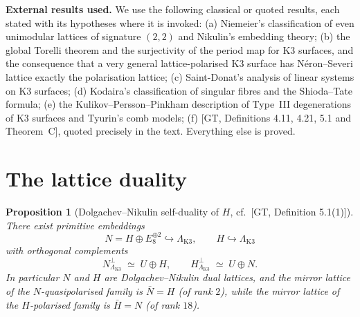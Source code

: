 \documentclass[11pt]{article}
\newtheorem{proposition}[theorem]{Proposition}
\begin{document}
\medskip

\noindent\textbf{External results used.} We use the following classical or
quoted results, each stated with its hypotheses where it is invoked:
(a) Niemeier's classification of even unimodular lattices of signature
$(2,2)$ and Nikulin's embedding theory; (b) the global Torelli theorem and
the surjectivity of the period map for K3 surfaces, and the consequence
that a very general lattice-polarised K3 surface has N\'eron--Severi lattice
exactly the polarisation lattice; (c) Saint-Donat's analysis of linear
systems on K3 surfaces; (d) Kodaira's classification of singular fibres and
the Shioda--Tate formula; (e) the Kulikov--Persson--Pinkham description of
Type~III degenerations of K3 surfaces and Tyurin's comb models; (f)
[GT, Definitions 4.11, 4.21, 5.1 and Theorem~C], quoted precisely in the
text. Everything else is proved.

\section{The lattice duality}\label{sec:lattice-duality}

\begin{proposition}[Dolgachev--Nikulin self-duality of $H$,
{cf.\ [GT, Definition 5.1(1)]}]\label{prop:DN}
There exist primitive embeddings
\[
N=H\oplus E_8^{\oplus 2}\hookrightarrow\Lambda_{\mathrm{K3}},
\qquad
H\hookrightarrow\Lambda_{\mathrm{K3}}
\]
with orthogonal complements
\[
N^{\perp}_{\Lambda_{\mathrm{K3}}}\;\simeq\;U\oplus H,
\qquad
H^{\perp}_{\Lambda_{\mathrm{K3}}}\;\simeq\;U\oplus N.
\]
In particular $N$ and $H$ are Dolgachev--Nikulin dual lattices, and the
mirror lattice of the $N$-quasipolarised family is $\bar N=H$ (of rank
$2$), while the mirror lattice of the $H$-polarised family is
$\bar H = N$ (of rank $18$).
\end{proposition}
\end{document}
